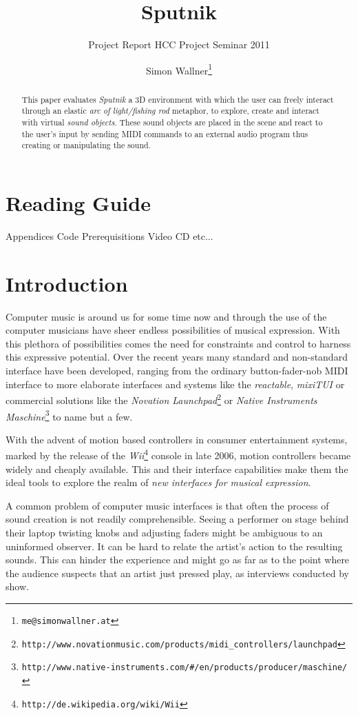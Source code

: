 \documentclass[10pt,a4paper]{scrartcl}
\title{Sputnik}
\subtitle{Project Report HCC Project Seminar 2011}
\author{Simon Wallner\footnote{\texttt{me@simonwallner.at}}}
\begin{document}
\maketitle

\begin{abstract}
This paper evaluates \emph{Sputnik} a 3D environment with which the user can freely interact through an elastic \emph{arc of light/fishing rod} metaphor, to explore, create and interact with virtual \emph{sound objects}. These sound objects are placed in the scene and react to the user's input by sending MIDI commands to an external audio program thus creating or manipulating the sound.

\end{abstract}

\section{Reading Guide}
Appendices
Code
Prerequisitions
Video
CD
etc...


\section{Introduction}

Computer music is around us for some time now and through the use of the computer musicians have sheer endless possibilities of musical expression. With this plethora of possibilities comes the need for constraints and control to harness this expressive potential. Over the recent years many standard and non-standard interface have been developed, ranging from the ordinary button-fader-nob MIDI interface to more elaborate interfaces and systems like the \emph{reactable}\cite{Jorda2007}, \emph{mixiTUI}\cite{Pedersen2009} or commercial solutions like the \emph{Novation Launchpad}\footnote{\texttt{http://www.novationmusic.com/products/midi\_controllers/launchpad}} or \emph{Native Instruments Maschine}\footnote{\texttt{http://www.native-instruments.com/\#/en/products/producer/maschine/}} to name but a few.

With the advent of motion based controllers in consumer entertainment systems, marked by the release of the \emph{Wii}\footnote{\texttt{http://de.wikipedia.org/wiki/Wii}} console in late 2006, motion controllers became widely and cheaply available. This and their interface capabilities make them the ideal tools to explore the realm of \emph{new interfaces for musical expression}.


A common problem of computer music interfaces is that often the process of sound creation is not readily comprehensible. Seeing a performer on stage behind their laptop twisting knobs and adjusting faders might be ambiguous to an uninformed observer. It can be hard to relate the artist's action to the resulting sounds. This can hinder the experience and might go as far as to the point where the audience suspects that an artist just pressed play, as interviews conducted by \cite{Pedersen2009} show.
\end{document}
